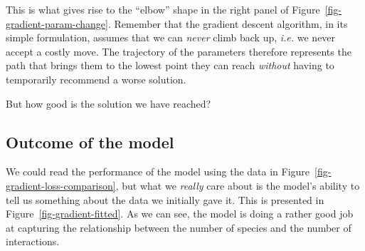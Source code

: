 \documentclass[
  letterpaper,
]{scrbook}
\begin{document}
{
\makeatletter
\def\LT@makecaption#1#2#3{%
  \noalign{\smash{\hbox{\kern\textwidth\rlap{\kern\marginparsep
  \parbox[t]{\marginparwidth}{%
    \footnotesize{%
      \vspace{(1.1\baselineskip)}
    #1{#2: }\ignorespaces #3}}}}}}%
    }
\makeatother

\begin{figure}[bt]



\end{figure}%

}

This is what gives rise to the ``elbow'' shape in the right panel of
Figure~\ref{fig-gradient-param-change}. Remember that the gradient
descent algorithm, in its simple formulation, assumes that we can
\emph{never} climb back up, \emph{i.e.} we never accept a costly move.
The trajectory of the parameters therefore represents the path that
brings them to the lowest point they can reach \emph{without} having to
temporarily recommend a worse solution.

But how good is the solution we have reached?

\subsection{Outcome of the model}\label{outcome-of-the-model}

We could read the performance of the model using the data in
Figure~\ref{fig-gradient-loss-comparison}, but what we \emph{really}
care about is the model's ability to tell us something about the data we
initially gave it. This is presented in
Figure~\ref{fig-gradient-fitted}. As we can see, the model is doing a
rather good job at capturing the relationship between the number of
species and the number of interactions.
\end{document}
